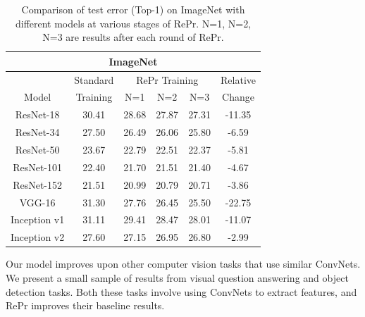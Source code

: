 \begin{table}[H]
\center
\begin{tabular}{cccccc}
\toprule
\multicolumn{6}{c}{\textbf{ImageNet}} \\
\midrule
      & Standard                             & \multicolumn{3}{c}{RePr Training}             &      Relative                       \\ \cline{3-5}
Model & Training & N=1 & N=2 & N=3 & Change \\ \midrule
\rowcolor[HTML]{EFEFEF} 
ResNet-18      & 30.41                       & 28.68        & 27.87        & {\color[HTML]{3166FF} 27.31} & -11.35                      \\
ResNet-34      & 27.50                       & 26.49        & 26.06        & {\color[HTML]{3166FF} 25.80} & -6.59                       \\
\rowcolor[HTML]{EFEFEF} 
ResNet-50      & 23.67                       & 22.79        & 22.51        & {\color[HTML]{3166FF} 22.37} & -5.81                       \\
ResNet-101     & 22.40                       & 21.70        & 21.51        & {\color[HTML]{3166FF} 21.40} & -4.67                       \\
\rowcolor[HTML]{EFEFEF} 
ResNet-152     & 21.51                       & 20.99        & 20.79        & {\color[HTML]{3166FF} 20.71} & -3.86                       \\
VGG-16         & 31.30                       & 27.76        & 26.45        & {\color[HTML]{3166FF} 25.50} & -22.75                      \\
\rowcolor[HTML]{EFEFEF} 
Inception v1   & 31.11                       & 29.41        & 28.47        & {\color[HTML]{3166FF} 28.01} & -11.07                      \\
Inception v2   & 27.60                       & 27.15        & 26.95        & {\color[HTML]{3166FF} 26.80} & -2.99                       \\ \bottomrule
\end{tabular}
   \caption[Results on ImageNet]{Comparison of test error (Top-1) on ImageNet with different models at various stages of RePr. N=1, N=2, N=3 are results after each round of RePr.}
   \label{tbl:imagenet}
\end{table}

Our model improves upon other computer vision tasks that use similar ConvNets. We present a small sample of results from visual question answering and object detection tasks.
Both these tasks involve using ConvNets to extract features, and RePr improves their baseline results.

